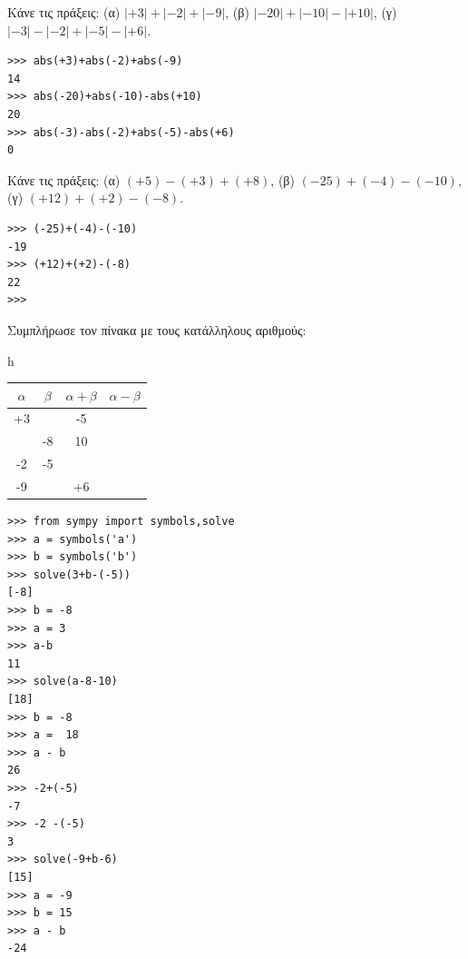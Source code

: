 \begin{exercise}
Κάνε    τις πράξεις:
(α) $|+3|    +   |-2|    +   |-9|$,       (β) $|-20|   +   |-10| - |+10|$,          (γ) $|-3| - |-2|+ |-5| - |+6|$.
\end{exercise}
\begin{lstlisting}
>>> abs(+3)+abs(-2)+abs(-9)
14
>>> abs(-20)+abs(-10)-abs(+10)
20
>>> abs(-3)-abs(-2)+abs(-5)-abs(+6)
0
\end{lstlisting}
\begin{exercise}
Κάνε    τις πράξεις:
(α) $(+5) - (+3) +   (+8)$,       (β) $(-25)   +   (-4)    -   (-10)$,      (γ) $(+12)   +   (+2)    -   (-8)$.
\end{exercise}
\begin{lstlisting}
>>> (-25)+(-4)-(-10)
-19
>>> (+12)+(+2)-(-8)
22
>>>
\end{lstlisting}
\begin{exercise}
Συμπλήρωσε  τον πίνακα  με  τους
κατάλληλους αριθμούς:       
\begin{table}{h}
\begin{tabular}{|c|c|c|c|}
\hline
$\alpha$&$\beta$&$\alpha+\beta$&$\alpha-\beta$\\\hline
+3&&-5&\\\hline
&-8&10&\\\hline
-2&-5&&\\\hline
-9&&+6&\\\hline
\end{tabular}
\end{table}
\end{exercise}
\begin{lstlisting}
>>> from sympy import symbols,solve
>>> a = symbols('a')
>>> b = symbols('b')
>>> solve(3+b-(-5))
[-8]
>>> b = -8
>>> a = 3
>>> a-b
11
>>> solve(a-8-10)
[18]
>>> b = -8
>>> a =  18
>>> a - b
26
>>> -2+(-5)
-7
>>> -2 -(-5)
3
>>> solve(-9+b-6)
[15]
>>> a = -9
>>> b = 15
>>> a - b
-24
\end{lstlisting}


